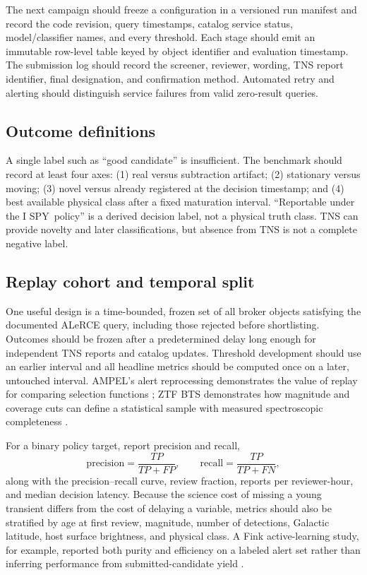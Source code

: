 \documentclass[11pt]{article}
\newcommand{\project}{I SPY}
\begin{document}
The next campaign should freeze a configuration in a versioned run manifest and record the code revision, query timestamps, catalog service status, model/classifier names, and every threshold. Each stage should emit an immutable row-level table keyed by object identifier and evaluation timestamp. The submission log should record the screener, reviewer, wording, TNS report identifier, final designation, and confirmation method. Automated retry and alerting should distinguish service failures from valid zero-result queries.

\subsection{Outcome definitions}

A single label such as ``good candidate'' is insufficient. The benchmark should record at least four axes: (1) real versus subtraction artifact; (2) stationary versus moving; (3) novel versus already registered at the decision timestamp; and (4) best available physical class after a fixed maturation interval. ``Reportable under the \project\ policy'' is a derived decision label, not a physical truth class. TNS can provide novelty and later classifications, but absence from TNS is not a complete negative label.

\subsection{Replay cohort and temporal split}

One useful design is a time-bounded, frozen set of all broker objects satisfying the documented ALeRCE query, including those rejected before shortlisting. Outcomes should be frozen after a predetermined delay long enough for independent TNS reports and catalog updates. Threshold development should use an earlier interval and all headline metrics should be computed once on a later, untouched interval. AMPEL's alert reprocessing demonstrates the value of replay for comparing selection functions \citep{nordin2019}; ZTF BTS demonstrates how magnitude and coverage cuts can define a statistical sample with measured spectroscopic completeness \citep{perley2020}.

For a binary policy target, report precision and recall,
\begin{equation}
  \mathrm{precision}=\frac{TP}{TP+FP}, \qquad
  \mathrm{recall}=\frac{TP}{TP+FN},
\end{equation}
along with the precision--recall curve, review fraction, reports per reviewer-hour, and median decision latency. Because the science cost of missing a young transient differs from the cost of delaying a variable, metrics should also be stratified by age at first review, magnitude, number of detections, Galactic latitude, host surface brightness, and physical class. A Fink active-learning study, for example, reported both purity and efficiency on a labeled alert set rather than inferring performance from submitted-candidate yield \citep{leoni2022}.
\end{document}
